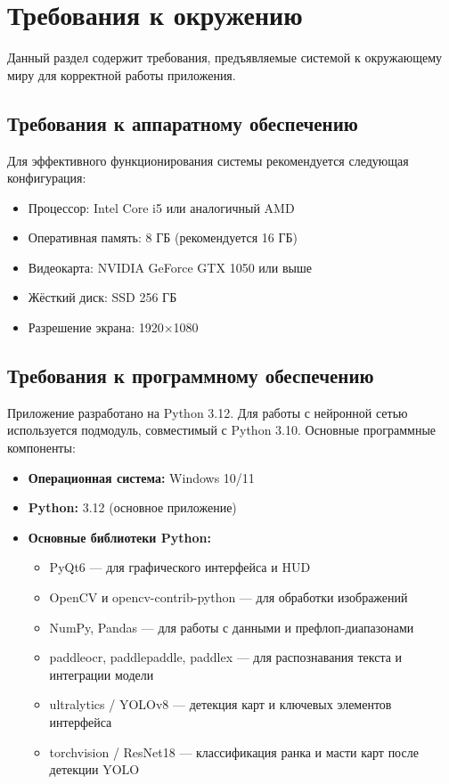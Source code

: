 \section{Требования к окружению}
\label{sec:environment}

Данный раздел содержит требования, предъявляемые системой к окружающему миру для корректной работы приложения.

\subsection{Требования к аппаратному обеспечению}

Для эффективного функционирования системы рекомендуется следующая конфигурация:

\begin{itemize}
    \item Процессор: Intel Core i5 или аналогичный AMD
    \item Оперативная память: 8 ГБ (рекомендуется 16 ГБ)
    \item Видеокарта: NVIDIA GeForce GTX 1050 или выше
    \item Жёсткий диск: SSD 256 ГБ
    \item Разрешение экрана: 1920×1080
\end{itemize}

\subsection{Требования к программному обеспечению}

Приложение разработано на Python 3.12. Для работы с нейронной сетью используется подмодуль, совместимый с Python 3.10. Основные программные компоненты:

\begin{itemize}
    \item \textbf{Операционная система:} Windows 10/11
    \item \textbf{Python:} 3.12 (основное приложение)
    \item \textbf{Основные библиотеки Python:}
    \begin{itemize}
        \item PyQt6 --- для графического интерфейса и HUD
        \item OpenCV и opencv-contrib-python --- для обработки изображений
        \item NumPy, Pandas --- для работы с данными и префлоп-диапазонами
        \item paddleocr, paddlepaddle, paddlex --- для распознавания текста и интеграции модели
        \item ultralytics / YOLOv8 --- детекция карт и ключевых элементов интерфейса
        \item torchvision / ResNet18 --- классификация ранка и масти карт после детекции YOLO
    \end{itemize}
\end{itemize}

